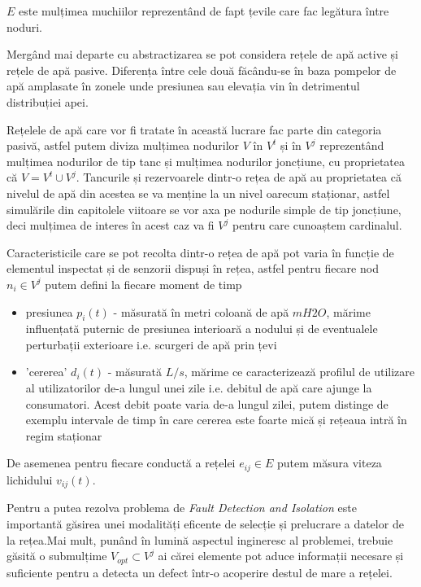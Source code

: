 $E$ este mulțimea muchiilor reprezentând de fapt țevile care fac legătura între noduri.

Mergând mai departe cu abstractizarea se pot considera rețele de apă active și rețele de apă pasive. Diferența între cele două făcându-se în baza pompelor de apă amplasate în zonele unde presiunea sau elevația vin în detrimentul distribuției apei.

Rețelele de apă care vor fi tratate în această lucrare fac parte din categoria pasivă, astfel putem diviza mulțimea nodurilor $V$ în $V^t$ și în $V^j$ reprezentând mulțimea nodurilor de tip tanc și mulțimea nodurilor joncțiune, cu proprietatea că $V = V^t \cup V^j$. Tancurile și rezervoarele dintr-o rețea de apă au proprietatea că nivelul de apă din acestea se va menține la un nivel oarecum staționar, astfel simulările din capitolele viitoare se vor axa pe nodurile simple de tip joncțiune, deci mulțimea de interes în acest caz va fi $V^j$ pentru care cunoaștem cardinalul.

Caracteristicile care se pot recolta dintr-o rețea de apă pot varia în funcție de elementul inspectat și de senzorii dispuși în rețea, astfel pentru fiecare nod $n_i \in V^j$ putem defini la fiecare moment de timp 
\begin{itemize}
\item presiunea $p_i(t)$ - măsurată în metri coloană de apă $mH2O$, mărime influențată puternic de presiunea interioară a nodului și de eventualele perturbații exterioare i.e. scurgeri de apă prin țevi
\item 'cererea' $d_i(t)$ - măsurată $L/s$, mărime ce caracterizează profilul de utilizare al utilizatorilor de-a lungul unei zile i.e. debitul de apă care ajunge la consumatori. Acest debit poate varia de-a lungul zilei, putem distinge de exemplu intervale de timp în care cererea este foarte mică și rețeaua intră în regim staționar
\end{itemize}

De asemenea pentru fiecare conductă a rețelei $e_{ij} \in E$ putem măsura viteza lichidului $v_{ij}(t)$.

Pentru a putea rezolva problema de \textit{Fault Detection and Isolation} este importantă găsirea unei modalități eficente de selecție și prelucrare a datelor de la rețea.Mai mult, punând în lumină aspectul ingineresc al problemei, trebuie găsită o submulțime $V_{opt} \subset V^j$ ai cărei elemente pot aduce informații necesare și suficiente pentru a detecta un defect într-o acoperire destul de mare a rețelei.

